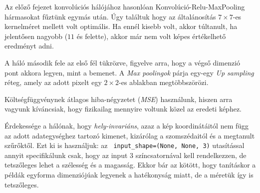 %
%
%	
%	
%	
%	
%	
%	
%	
%	
%	
%	
%	
%


Az előző fejezet konvolúciós hálójához hasonlóan Konvolúció-Relu-MaxPooling hármasokat
fűztünk egymás után. Úgy találtuk hogy az általánosítás $ 7 \times 7 $-es kernelméret 
mellett volt optimális. Ha ennél kisebb volt, akkor túltanult, ha jelentősen nagyobb 
($ 11 $ és felette), akkor  már nem volt képes értékelhető eredményt adni.

A háló második fele az első fél tükrözve, figyelve arra, hogy a végső dimenzió pont akkora 
legyen, mint a bemenet. A \textit{Max poolingok} párja egy-egy \textit{Up sampling} réteg, amely az adott
pixelt egy $ 2 \times 2 $-es ablakban megtöbbszörözi.

Költségfüggvénynek átlagos hiba-négyzetet (\textit{MSE}) használunk, hiszen arra vagyunk 
kíváncsiak, hogy fizikailag mennyire voltunk közel az eredeti képhez.


Érdekessége a hálónak, hogy \textit{hely-invariáns}, azaz a kép koordinátáitól nem függ az adott
adategységhez tartozó kimenet, kizárólag a szomszédaitól és a megtanult szűrőktől.
Ezt ki is használjuk: az \texttt{ input\_shape=(None, None, 3)} utasítással annyit
specifikálunk csak, hogy az input 3 színcsatornával kell rendelkezzen, de tetszőleges
lehet a szélesség és a magasság. Ekkor bár az kötött, hogy tanításkor a példák egyforma 
dimenziójúak legyenek a hatékonyság miatt, de a méretük így is tetszőleges.


